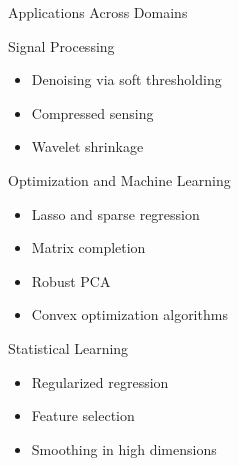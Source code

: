 \documentclass[aspectratio=169,10pt]{beamer}
\begin{document}
\begin{frame}{Applications Across Domains}
\begin{block}{Signal Processing}
\begin{itemize}
    \item Denoising via soft thresholding
    \item Compressed sensing
    \item Wavelet shrinkage
\end{itemize}
\end{block}

\begin{block}{Optimization and Machine Learning}
\begin{itemize}
    \item Lasso and sparse regression
    \item Matrix completion
    \item Robust PCA
    \item Convex optimization algorithms
\end{itemize}
\end{block}

\begin{block}{Statistical Learning}
\begin{itemize}
    \item Regularized regression
    \item Feature selection
    \item Smoothing in high dimensions
\end{itemize}
\end{block}
\end{frame}
\end{document}
